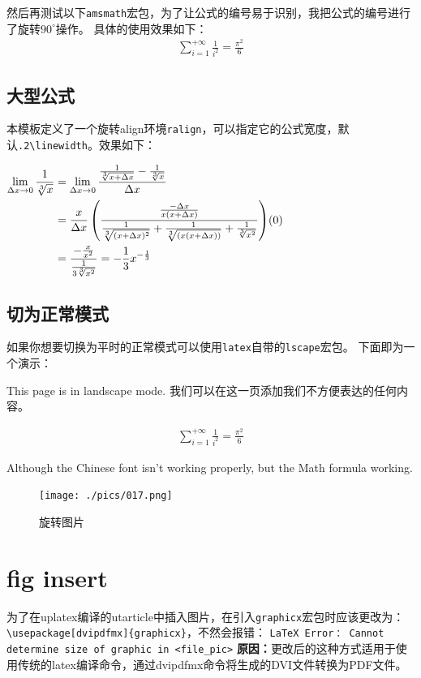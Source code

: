 \documentclass{utarticle}
\newenvironment{ralign}[1][.2\linewidth]{%
    \leavevmode\newline 
	\begin{adjustbox}{angle=90, center}
	\minipage{#1}
    \begin{center}$
    \begin{aligned}%
}{%
    \end{aligned}
    \hfill(\theequation)
    $\end{center}
    \endminipage
	\end{adjustbox}
}
\begin{document}
然后再测试以下\verb|amsmath|宏包，为了让公式的编号易于识别，我把公式的编号进行了旋转$90^\circ$操作。
具体的使用效果如下：
\begin{align}
    \sum_{i=1}^{+\infty}{\frac{1}{i^2}} = \frac{\pi^2}{6}
\end{align}

\subsection{大型公式}
本模板定义了一个旋转align环境\verb|ralign|，可以指定它的公式宽度，默认\verb|.2\linewidth|。效果如下：
\begin{ralign}[.5\linewidth]
    \lim _{\Delta x \rightarrow 0} \frac{1}{\sqrt[3]{x}} & =\lim _{\Delta x \rightarrow 0} \frac{\frac{1}{\sqrt[3]{x+\Delta x}}-\frac{1}{\sqrt[3]{x}}}{\Delta x} \\
    & =\frac{x}{\Delta x}\left(\frac{\frac{-\Delta x}{x(x+\Delta x)}}{\frac{1}{\sqrt[3]{(x+\Delta x)^{2}}}+\frac{1}{\sqrt[3]{(x(x+\Delta x))}}+\frac{1}{\sqrt[3]{x^{2}}}}\right) \\
    & =\frac{-\frac{x}{x^{2}}}{\frac{1}{3 \sqrt[3]{x^{2}}}}=-\frac{1}{3} x^{-\frac{1}{3}}
\end{ralign}

\subsection{切为正常模式}
如果你想要切换为平时的正常模式可以使用\verb|latex|自带的\verb|lscape|宏包。
下面即为一个演示：
\begin{landscape}
    This page is in landscape mode. 我们可以在这一页添加我们不方便表达的任何内容。

    \begin{align}
        \sum_{i=1}^{+\infty}{\frac{1}{i^2}} = \frac{\pi^2}{6}
    \end{align}

    Although the Chinese font isn't working properly, but the Math formula working.

    \vspace*{5em}
    \begin{figure}[!htb]
        \centering
        \texttt{[image: ./pics/017.png]}
        \caption{旋转图片}
        \label{旋转图片}
    \end{figure}
\end{landscape}


\clearpage
\section{fig insert}
为了在uplatex编译的utarticle中插入图片，在引入\verb|graphicx|宏包时应该更改为：
\verb|\usepackage[dvipdfmx]{graphicx}|，不然会报错：
\verb|LaTeX Error： Cannot determine size of graphic in <file_pic>|
{\bfseries 原因：}更改后的这种方式适用于使用传统的latex编译命令，通过dvipdfmx命令将生成的DVI文件转换为PDF文件。
\end{document}
